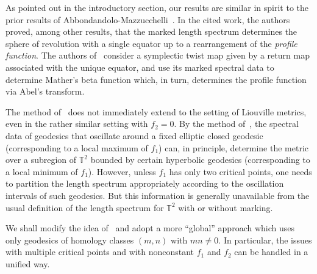 \documentclass[11pt,letterpaper,oneside]{amsart}
\newcommand{\T}{\mathbb{T}}
\theoremstyle{definition}
\theoremstyle{remark}
\theoremstyle{definition}
\theoremstyle{remark}
\begin{document}
As pointed out in the introductory section, our results are similar in spirit to the prior results of Abbondandolo-Mazzucchelli~\cite{AbbondandoloMazzucchelli2026}. 
In the cited work, the authors proved, among other results, that the marked length spectrum determines the sphere of revolution with a single equator up to a rearrangement of the \emph{profile function}.
The authors of~\cite{AbbondandoloMazzucchelli2026} consider a symplectic twist map given by a return map associated with the unique equator, and use its marked spectral data to determine Mather's beta function which, in turn, determines the profile function via Abel's transform.

\medskip

The method of~\cite{AbbondandoloMazzucchelli2026} does not immediately extend to the setting of Liouville metrics, even in the rather similar setting with $f_2 = 0$.
By the method of~\cite{AbbondandoloMazzucchelli2026}, the spectral data of geodesics that oscillate around a fixed elliptic closed geodesic (corresponding to a local maximum of $f_1$) can, in principle, determine the metric over a subregion of $\T^2$ bounded by certain hyperbolic geodesics (corresponding to a local minimum of $f_1$).
However, unless $f_1$ has only two critical points, one needs to partition the length spectrum appropriately according to the oscillation intervals of such geodesics. But this information is generally unavailable from the usual definition of the length spectrum for $\T^2$ with or without marking.

\medskip

We shall modify the idea of~\cite{AbbondandoloMazzucchelli2026} and adopt a more ``global'' approach which uses only geodesics of homology classes $(m,n)$ with $mn \neq 0$.
In particular, the issues with multiple critical points and with nonconstant $f_1$ and $f_2$ can be handled in a unified way.

\medskip
\end{document}
